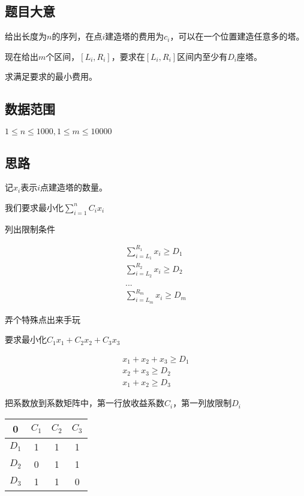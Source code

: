 \documentclass{ctexart}
\numberwithin{equation}{section}
\begin{document}
\begin{flushleft}
  \subsection{题目大意}
  给出长度为$n$的序列，在点$i$建造塔的费用为$c_i$，可以在一个位置建造任意多的塔。

  现在给出$m$个区间，$[L_i,R_i]$，要求在$[L_i,R_i]$区间内至少有$D_i$座塔。

  求满足要求的最小费用。
  
    
  \subsection{数据范围}
  $1\le n \le 1000,1\le m\le 10000$
  \subsection{思路}

  记$x_i$表示$i$点建造塔的数量。
  
  我们要求最小化$\sum\limits_{i=1}^n C_ix_i$

  列出限制条件
  
  \begin{eqnarray*} 
    \sum_{i=L_1}^{R_1}x_i \ge D_1 \\
    \sum_{i=L_2}^{R_2}x_i \ge D_2\\
    ~\\
    ...\\
    \sum_{i=L_m}^{R_m}x_i \ge D_m
  \end{eqnarray*}

  弄个特殊点出来手玩

  要求最小化$C_1x_1+C_2x_2+C_3x_3$
  
  \begin{eqnarray*} 
    x_1+x_2+x_3 \ge D_1 \\
    x_2+x_3 \ge D_2\\
    x_1+x_2 \ge D_3
  \end{eqnarray*}

  \newpage

  把系数放到系数矩阵中，第一行放收益系数$C_i$，第一列放限制$D_i$

  
  \begin{tabular}{c|ccc}
    \hline 0&$C_1$&$C_2$&$C_3$\\
	\hline $D_1$&1&1&1\\
	\hline $D_2$&0&1&1\\
	\hline $D_3$&1&1&0\\
	\hline
  \end{tabular}


\end{flushleft}
\end{document}
